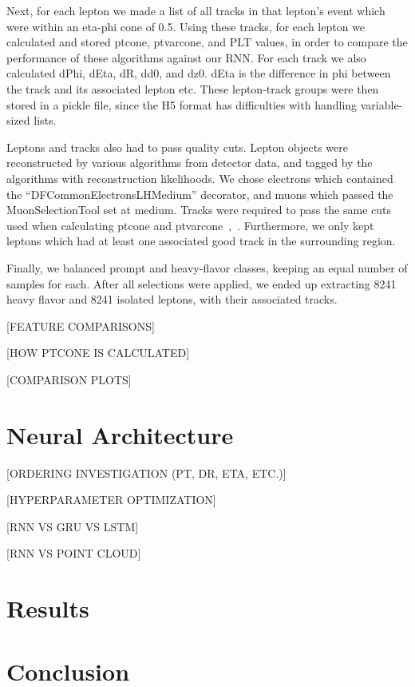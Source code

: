 Next, for each lepton we made a list of all tracks in that lepton's event which were within an eta-phi cone of 0.5. Using these tracks, for each lepton we calculated and stored ptcone, ptvarcone, and PLT values, in order to compare the performance of these algorithms against our RNN. For each track we also calculated dPhi, dEta, dR, dd0, and dz0. dEta is the difference in phi between the track and its associated lepton etc. These lepton-track groups were then stored in a pickle file, since the H5 format has difficulties with handling variable-sized lists.

Leptons and tracks also had to pass quality cuts. Lepton objects were reconstructed by various algorithms from detector data, and tagged by the algorithms with reconstruction likelihoods. We chose electrons which contained the “DFCommonElectronsLHMedium” decorator, and muons which passed the MuonSelectionTool set at medium. Tracks were required to pass the same cuts used when calculating ptcone and ptvarcone~\cite{run2isolation},~\cite{trackingcp}. Furthermore, we only kept leptons which had at least one associated good track in the surrounding region.



Finally, we balanced prompt and heavy-flavor classes, keeping an equal number of samples for each. After all selections were applied, we ended up extracting 8241 heavy flavor and 8241 isolated leptons, with their associated tracks.


\label{sec:dataexamination}

[FEATURE COMPARISONS]

[HOW PTCONE IS CALCULATED]

[COMPARISON PLOTS]

\section{Neural Architecture}\label{sec:architecture}

[ORDERING INVESTIGATION (PT, DR, ETA, ETC.)]

[HYPERPARAMETER OPTIMIZATION]

[RNN VS GRU VS LSTM]

[RNN VS POINT CLOUD]

\section{Results}

\section{Conclusion}